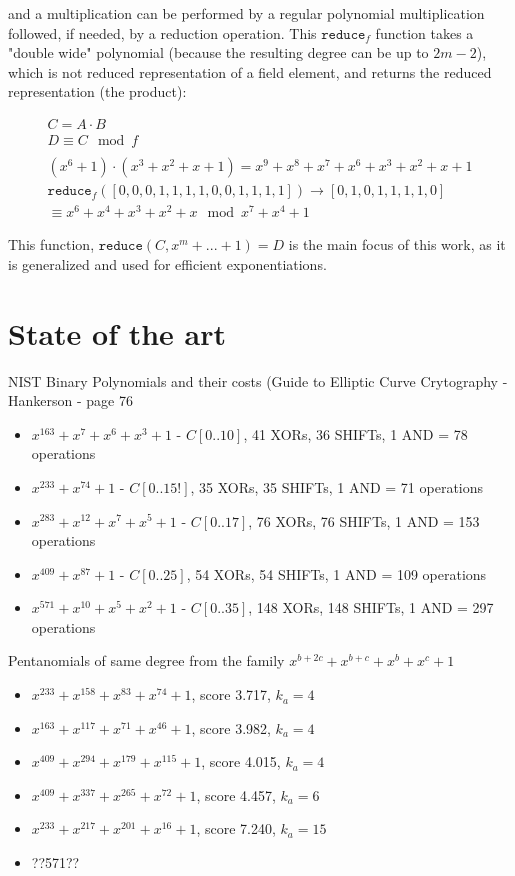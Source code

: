 and a multiplication can be performed by a regular polynomial multiplication followed, if needed, by a reduction operation. This $\texttt{reduce}_f$ function takes a "double wide" polynomial (because the resulting degree can be up to $2m-2$), which is not reduced representation of a field element, and returns the reduced representation (the product):

\begin{gather*}
C = A \cdot B\\
D \equiv C \mod f\\
\\
(x^6+1) \cdot (x^3+x^2+x+1) = x^9 + x^8 + x^7 + x^6 + x^3 + x^2 + x + 1 \\
\texttt{reduce}_f([0, 0, 0, 1, 1, 1, 1, 0, 0, 1, 1, 1, 1]) \rightarrow [0, 1, 0, 1, 1, 1, 1, 0]\\
\equiv x^6 + x^4 + x^3 + x^2 + x \mod x^7+x^4+1
\end{gather*}

This function, $\texttt{reduce}(C, x^m+...+1) = D$ is the main focus of this work, as it is generalized and used for efficient exponentiations.


\section{State of the art}


NIST Binary Polynomials and their costs (Guide to Elliptic Curve Crytography - Hankerson - page 76

\begin{itemize}
\item $x^{163} + x^7 + x^6 + x^3 + 1$ - $C[0..10]$, 41 XORs, 36 SHIFTs, 1 AND = 78 operations
\item $x^{233} + x^{74} + 1$ - $C[0..15!]$, 35 XORs, 35 SHIFTs, 1 AND = 71 operations
\item $x^{283} + x^{12} + x^7 + x^5 + 1$ - $C[0..17]$, 76 XORs, 76 SHIFTs, 1 AND = 153 operations
\item $x^{409} + x^{87} + 1$ - $C[0..25]$, 54 XORs, 54 SHIFTs, 1 AND = 109 operations
\item $x^{571} + x^{10} + x^5 + x^2 + 1$ - $C[0..35]$, 148 XORs, 148 SHIFTs, 1 AND = 297 operations
\end{itemize}


Pentanomials of same degree from the family $x^{b+2c} + x^{b+c} + x^b + x^c + 1$

\begin{itemize}
\item $x^{233} + x^{158} + x^{83} + x^{74} + 1$, score 3.717, $k_a=4$
\item $x^{163} + x^{117} + x^{71} + x^{46} + 1$, score 3.982, $k_a=4$
\item $x^{409} + x^{294} + x^{179} + x^{115} + 1$, score 4.015, $k_a=4$
\item $x^{409} + x^{337} + x^{265} + x^{72} + 1$, score 4.457, $k_a=6$
\item $x^{233} + x^{217} + x^{201} + x^{16} + 1$, score 7.240, $k_a=15$
\item ??571??
\end{itemize}

